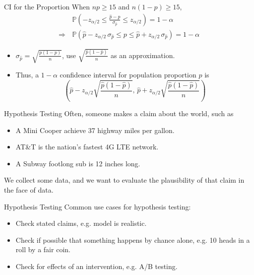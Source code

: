 \documentclass{beamer}
\newcommand{\pr}{\mathbb{P}}
\newcommand{\h}{\widehat}
\begin{document}
\begin{frame}{CI for the Proportion}
When $np\geq 15$ and $n(1-p)\geq 15$,
\begin{align*}
 & \pr(-z_{\alpha/2} \leq \frac{\h p - p }{\sigma_{\h p}}  \leq z_{\alpha/2}) = 1-\alpha\\
\Rightarrow \, & \pr(\h p - z_{\alpha/2}\, \sigma_{\h p} \leq p \leq 
 \h p + z_{\alpha/2} \,\sigma_{\h p} ) = 1-\alpha
\end{align*}

\begin{itemize}
\item $\sigma_{\h p} = \sqrt{\frac{p(1-p)}{n}}$, use $\sqrt{\frac{\h p(1-\h p)}{n}}$ as an approximation. 
\item Thus, a $1-\alpha$ confidence interval for population proportion $p$ is 
\[
\left( \h p - z_{\alpha/2} \sqrt{\frac{\h p(1-\h p)}{n}},\, 
 \h p + z_{\alpha/2} \sqrt{\frac{\h p(1-\h p)}{n}}\right)
\]
\end{itemize}
\end{frame}

\begin{frame}{Hypothesis Testing}
Often, someone makes a claim about the world, such as 
\begin{itemize}
\item A Mini Cooper achieve 37 highway miles per gallon.
\item AT\&T is the nation’s fastest 4G LTE network.
\item A Subway footlong sub is 12 inches long.
\end{itemize}

We collect some data, and we want to evaluate the plausibility of that claim in the face of data.
\end{frame}

\begin{frame}{Hypothesis Testing}
Common use cases for hypothesis testing:
\begin{itemize}
\item Check stated claims, e.g. model is realistic.
\item Check if possible that something happens by chance alone, e.g. 10 heads in a roll by a fair coin.
\item Check for effects of an intervention, e.g. A/B testing. 
\end{itemize}
\end{frame}
\end{document}
